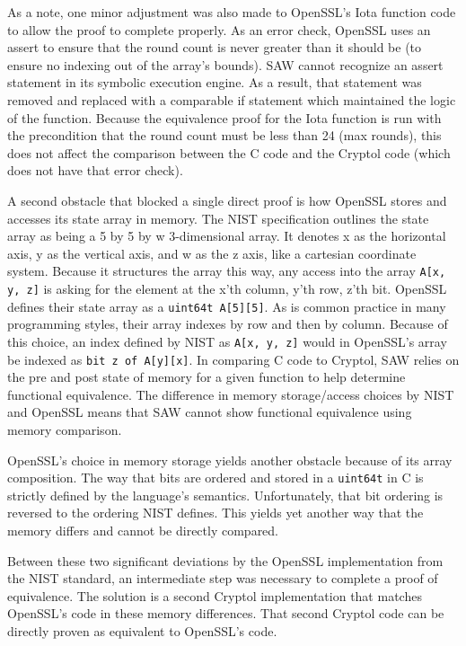 As a note, one minor adjustment was also made to OpenSSL's Iota function code to allow the proof to complete properly.
As an error check, OpenSSL uses an assert to ensure that the round count is never greater than it should be (to ensure no indexing out of the array's bounds).
SAW cannot recognize an assert statement in its symbolic execution engine.
As a result, that statement was removed and replaced with a comparable if statement which maintained the logic of the function.
Because the equivalence proof for the Iota function is run with the precondition that the round count must be less than 24 (max rounds), this does not affect the comparison between the C code and the Cryptol code (which does not have that error check).

A second obstacle that blocked a single direct proof is how OpenSSL stores and accesses its state array in memory.  
The NIST specification outlines the state array as being a 5 by 5 by w 3-dimensional array.
It denotes x as the horizontal axis, y as the vertical axis, and w as the z axis, like a cartesian coordinate system.
Because it structures the array this way, any access into the array \texttt{A[x, y, z]} is asking for the element at the x'th column, y'th row, z'th bit.
OpenSSL defines their state array as a \texttt{uint64\textunderscore t A[5][5]}.
As is common practice in many programming styles, their array indexes by row and then by column.
Because of this choice, an index defined by NIST as \texttt{A[x, y, z]} would in OpenSSL's array be indexed as \texttt{bit z of A[y][x]}.
In comparing C code to Cryptol, SAW relies on the pre and post state of memory for a given function to help determine functional equivalence.
The difference in memory storage/access choices by NIST and OpenSSL means that SAW cannot show functional equivalence using memory comparison.

OpenSSL's choice in memory storage yields another obstacle because of its array composition.
The way that bits are ordered and stored in a \texttt{uint64\textunderscore t} in C is strictly defined by the language's semantics.
Unfortunately, that bit ordering is reversed to the ordering NIST defines.
This yields yet another way that the memory differs and cannot be directly compared.

Between these two significant deviations by the OpenSSL implementation from the NIST standard, an intermediate step was necessary to complete a proof of equivalence.
The solution is a second Cryptol implementation that matches OpenSSL's code in these memory differences.
That second Cryptol code can be directly proven as equivalent to OpenSSL's code.

